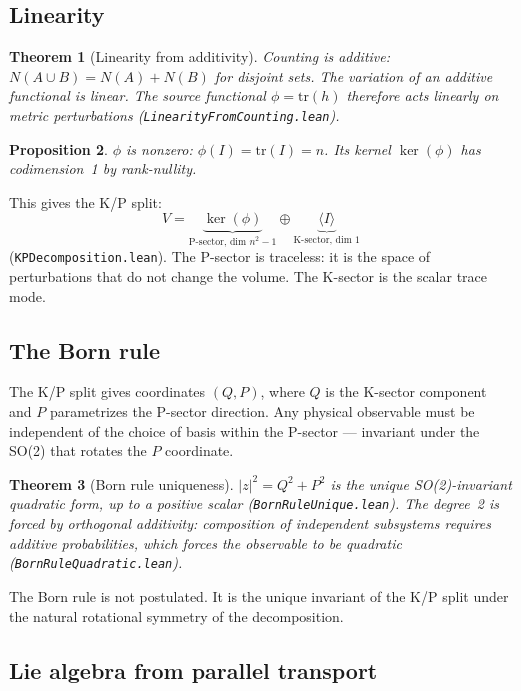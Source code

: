 \documentclass[11pt,letterpaper]{article}
\newtheorem{theorem}{Theorem}
\newtheorem{proposition}[theorem]{Proposition}
\theoremstyle{remark}
\newcommand{\lean}[1]{\texttt{\small #1}}
\begin{document}
\subsection{Linearity}

\begin{theorem}[Linearity from additivity]
\label{thm:linearity}
Counting is additive: $N(A \cup B) = N(A) + N(B)$ for disjoint sets.
The variation of an additive functional is linear. The source
functional $\phi = \mathrm{tr}(h)$ therefore acts linearly on metric
perturbations (\lean{LinearityFromCounting.lean}).
\end{theorem}

\begin{proposition}
$\phi$ is nonzero: $\phi(I) = \mathrm{tr}(I) = n$. Its kernel
$\ker(\phi)$ has codimension~1 by rank-nullity.
\end{proposition}

This gives the K/P split:
\[
  V = \underbrace{\ker(\phi)}_{\text{P-sector, dim }n^2 - 1}
  \oplus \underbrace{\langle I\rangle}_{\text{K-sector, dim }1}
\]
(\lean{KPDecomposition.lean}). The P-sector is traceless: it is the
space of perturbations that do not change the volume. The K-sector
is the scalar trace mode.

\subsection{The Born rule}

The K/P split gives coordinates $(Q, P)$, where $Q$ is the K-sector
component and $P$ parametrizes the P-sector direction. Any physical
observable must be independent of the choice of basis within the
P-sector — invariant under the SO(2) that rotates the $P$ coordinate.

\begin{theorem}[Born rule uniqueness]
\label{thm:born}
$|z|^2 = Q^2 + P^2$ is the unique SO(2)-invariant quadratic form,
up to a positive scalar
(\lean{BornRuleUnique.lean}). The degree~2 is forced by orthogonal
additivity: composition of independent subsystems requires
additive probabilities, which forces the observable to be quadratic
(\lean{BornRuleQuadratic.lean}).
\end{theorem}

\noindent The Born rule is not postulated. It is the unique
invariant of the K/P split under the natural rotational symmetry
of the decomposition.

\subsection{Lie algebra from parallel transport}
\end{document}
